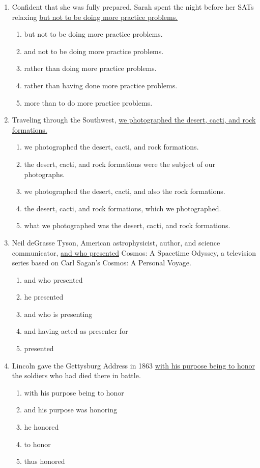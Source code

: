\documentclass[12pt]{book}
\begin{document}
\begin{enumerate}
\bigskip
\item Confident that she was fully prepared, Sarah spent the night before her SATs relaxing \underline{but not to be doing more practice problems.}
\begin{enumerate}[label=(\Alph*)]
\item but not to be doing more practice problems.
\item and not to be doing more practice problems.
\item rather than doing more practice problems. 
\item rather than having done more practice problems.
\item more than to do more practice problems.
\end{enumerate}

\bigskip
\item Traveling through the Southwest, \underline{we photographed the desert, cacti, and rock formations.}
\begin{enumerate}[label=(\Alph*)]
\item we photographed the desert, cacti, and rock formations.
\item the desert, cacti, and rock formations were the subject of our photographs.
\item we photographed the desert, cacti, and also the rock formations.
\item the desert, cacti, and rock formations, which we photographed.
\item what we photographed was the desert, cacti, and rock formations.
\end{enumerate}

\newpage
\item Neil deGrasse Tyson, American astrophysicist, author, and science communicator, \ul{and who presented} Cosmos: A Spacetime Odyssey, a television series based on Carl Sagan's Cosmos: A Personal Voyage.
\begin{enumerate}[label=(\Alph*)]
\item and who presented
\item he presented
\item and who is presenting
\item and having acted as presenter for
\item presented
\end{enumerate}

\bigskip
\item Lincoln gave the Gettysburg Address in 1863 \underline{with his purpose being to honor} the soldiers who had died there in battle.
\begin{enumerate}[label=(\Alph*)]
\item with his purpose being to honor
\item and his purpose was honoring
\item he honored
\item to honor
\item thus honored
\end{enumerate}


\end{enumerate}
\end{document}
